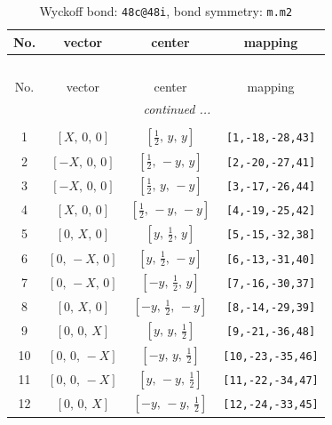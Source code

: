 \documentclass[fleqn,8pt]{jsarticle}
\begin{document}
\renewcommand{\arraystretch}{1.2}
\begin{longtable}{cccc}
\caption{Wyckoff bond: {\tt 48c@48i}, bond symmetry: {\tt m.m2}}
 \\
 \hline \hline
No. & vector & center & mapping \\ \hline \endfirsthead

\multicolumn{3}{l}{\tablename\ \thetable{}} \\
 \hline \hline
No. & vector & center & mapping \\ \hline \endhead

 \hline \hline
\multicolumn{3}{r}{\footnotesize\it continued ...} \\ \endfoot

 \hline \hline
\multicolumn{3}{r}{} \\ \endlastfoot

1 & $\left[ X,\, 0,\, 0 \right]$ & $\left[ \frac{1}{2},\, y,\, y \right]$ & {\tt [1,-18,-28,43]} \\ \hline
2 & $\left[ - X,\, 0,\, 0 \right]$ & $\left[ \frac{1}{2},\, - y,\, y \right]$ & {\tt [2,-20,-27,41]} \\ \hline
3 & $\left[ - X,\, 0,\, 0 \right]$ & $\left[ \frac{1}{2},\, y,\, - y \right]$ & {\tt [3,-17,-26,44]} \\ \hline
4 & $\left[ X,\, 0,\, 0 \right]$ & $\left[ \frac{1}{2},\, - y,\, - y \right]$ & {\tt [4,-19,-25,42]} \\ \hline
5 & $\left[ 0,\, X,\, 0 \right]$ & $\left[ y,\, \frac{1}{2},\, y \right]$ & {\tt [5,-15,-32,38]} \\ \hline
6 & $\left[ 0,\, - X,\, 0 \right]$ & $\left[ y,\, \frac{1}{2},\, - y \right]$ & {\tt [6,-13,-31,40]} \\ \hline
7 & $\left[ 0,\, - X,\, 0 \right]$ & $\left[ - y,\, \frac{1}{2},\, y \right]$ & {\tt [7,-16,-30,37]} \\ \hline
8 & $\left[ 0,\, X,\, 0 \right]$ & $\left[ - y,\, \frac{1}{2},\, - y \right]$ & {\tt [8,-14,-29,39]} \\ \hline
9 & $\left[ 0,\, 0,\, X \right]$ & $\left[ y,\, y,\, \frac{1}{2} \right]$ & {\tt [9,-21,-36,48]} \\ \hline
10 & $\left[ 0,\, 0,\, - X \right]$ & $\left[ - y,\, y,\, \frac{1}{2} \right]$ & {\tt [10,-23,-35,46]} \\ \hline
11 & $\left[ 0,\, 0,\, - X \right]$ & $\left[ y,\, - y,\, \frac{1}{2} \right]$ & {\tt [11,-22,-34,47]} \\ \hline
12 & $\left[ 0,\, 0,\, X \right]$ & $\left[ - y,\, - y,\, \frac{1}{2} \right]$ & {\tt [12,-24,-33,45]} \\
\end{longtable}
\end{document}
